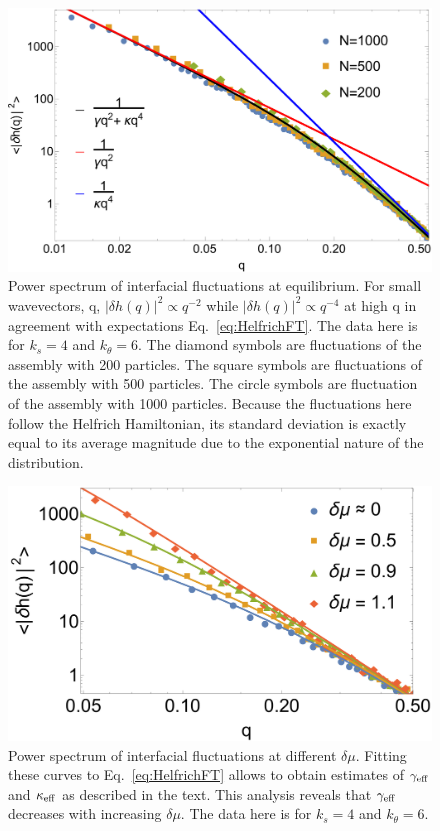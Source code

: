\documentclass[amsmath,preprintnumbers,10pt,nofootinbib,prl,twocolumn]{revtex4-1}
\begin{document}
\begin{figure}[tbb]
\centering
\includegraphics[scale=0.29]{scalingindependentofsizeFig2.pdf}
\caption{Power spectrum of interfacial fluctuations at equilibrium. For small wavevectors, q, $|\delta h(q)|^2\propto q^{-2}$ while $|\delta h(q)|^2\propto q^{-4}$ at high q in agreement with expectations Eq.~\ref{eq:HelfrichFT}. The data here is for $k_s=4$ and $k_\theta = 6$. The diamond symbols are fluctuations of the assembly with 200 particles. The square symbols are fluctuations of the assembly with 500 particles. The circle symbols are fluctuation of the assembly with 1000 particles. Because the fluctuations here follow the Helfrich Hamiltonian, its standard deviation is exactly equal to its average magnitude due to the exponential nature of the distribution.} \label{fig:HelfrichScaling}
\end{figure}

\begin{figure}[tbb]
\centering
\includegraphics[scale=0.34]{newscalingacrossFig3.pdf}
\caption{Power spectrum of interfacial fluctuations at different $\delta\mu$. Fitting these curves to Eq.~\ref{eq:HelfrichFT} allows to obtain estimates of $\gamma_{\rm eff}$ and $\kappa_{\rm eff}$ as described in the text. This analysis reveals that $\gamma_{\rm eff}$ decreases with increasing $\delta\mu$. The data here is for $k_s=4$ and $k_\theta = 6$.} \label{fig:Helfrich}
\end{figure}
\end{document}
